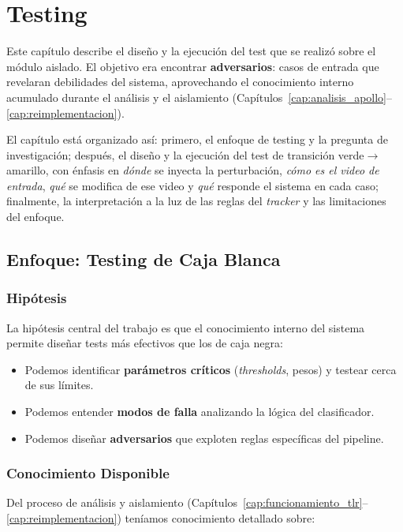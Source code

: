 \chapter{Testing}
\label{cap:diseno_tests}

Este capítulo describe el diseño y la ejecución del test que se realizó sobre el módulo aislado. El objetivo era encontrar \textbf{adversarios}: casos de entrada que revelaran debilidades del sistema, aprovechando el conocimiento interno acumulado durante el análisis y el aislamiento (Capítulos~\ref{cap:analisis_apollo}--\ref{cap:reimplementacion}).

El capítulo está organizado así: primero, el enfoque de testing y la pregunta de investigación; después, el diseño y la ejecución del test de transición verde$\to$amarillo, con énfasis en \textit{dónde} se inyecta la perturbación, \textit{cómo es el video de entrada}, \textit{qué} se modifica de ese video y \textit{qué} responde el sistema en cada caso; finalmente, la interpretación a la luz de las reglas del \textit{tracker} y las limitaciones del enfoque.

\section{Enfoque: Testing de Caja Blanca}

\subsection{Hipótesis}

La hipótesis central del trabajo es que el conocimiento interno del sistema permite diseñar tests más efectivos que los de caja negra:

\begin{itemize}
    \item Podemos identificar \textbf{parámetros críticos} (\textit{thresholds}, pesos) y testear cerca de sus límites.
    \item Podemos entender \textbf{modos de falla} analizando la lógica del clasificador.
    \item Podemos diseñar \textbf{adversarios} que exploten reglas específicas del pipeline.
\end{itemize}

\subsection{Conocimiento Disponible}

Del proceso de análisis y aislamiento (Capítulos~\ref{cap:funcionamiento_tlr}--\ref{cap:reimplementacion}) teníamos conocimiento detallado sobre:

